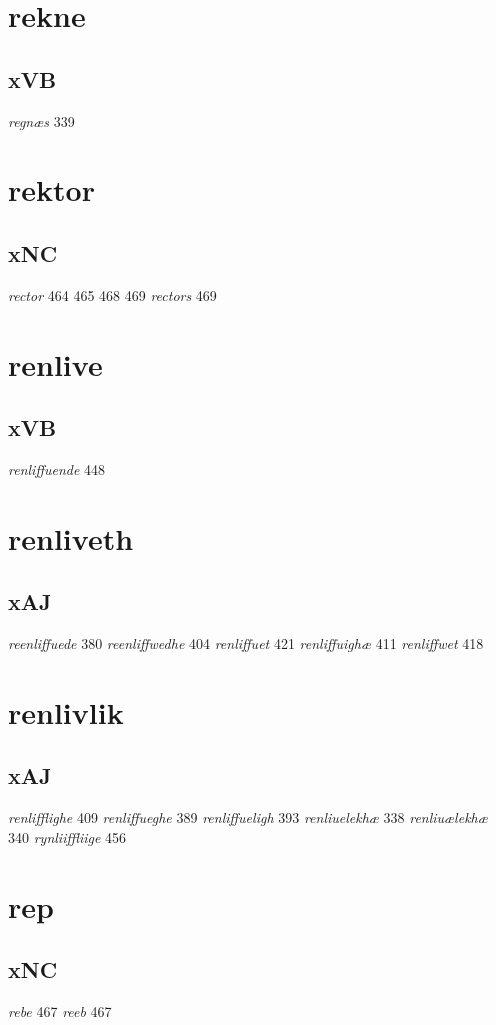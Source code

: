 \documentclass[a4paper,twocolumn]{article}
\begin{document}
\section{rekne}
\label{sec:org32c99b2}
\subsection{xVB}
\label{sec:org900f7f9}
\emph{regnæs} 339 
\section{rektor}
\label{sec:org11a036b}
\subsection{xNC}
\label{sec:org56099a6}
\emph{rector} 464 465 468 469 \emph{rectors} 469 
\section{renlive}
\label{sec:orgc644bf1}
\subsection{xVB}
\label{sec:org3c1a026}
\emph{renliffuende} 448 
\section{renliveth}
\label{sec:org2294167}
\subsection{xAJ}
\label{sec:orgf989ed8}
\emph{reenliffuede} 380 \emph{reenliffwedhe} 404 \emph{renliffuet} 421 \emph{renliffuighæ} 411 \emph{renliffwet} 418 
\section{renlivlik}
\label{sec:orgf31a353}
\subsection{xAJ}
\label{sec:orga9013fb}
\emph{renlifflighe} 409 \emph{renliffueghe} 389 \emph{renliffueligh} 393 \emph{renliuelekhæ} 338 \emph{renliuælekhæ} 340 \emph{rynliiffliige} 456 
\section{rep}
\label{sec:org35e10a4}
\subsection{xNC}
\label{sec:org43c81ea}
\emph{rebe} 467 \emph{reeb} 467 
\end{document}
